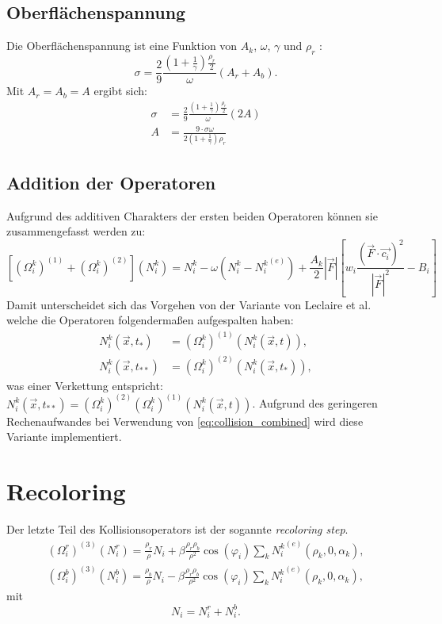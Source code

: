 \documentclass[a4paper,10pt]{scrreprt}
\begin{document}
\subsection{Oberflächenspannung}
Die Oberflächenspannung ist eine Funktion von $A_k$, $\omega$, $\gamma$ und $\rho_r$ \cite{Leclaire2011}:
\begin{equation}
 \sigma = \frac{2}{9} \frac{ \left( 1 + \frac{1}{\gamma} \right)   \frac{\rho_r}{2}  }{\omega} (A_r + A_b).
\end{equation}
Mit  $A_r = A_b = A$ ergibt sich:
\begin{align}
 \sigma &= \frac{2}{9} \frac{ \left( 1 + \frac{1}{\gamma} \right)   \frac{\rho_r}{2}  }{\omega} (2 A) \\
 A &= \frac{9 \cdot \sigma \omega}{ 2 \left( 1 + \frac{1}{\gamma} \right)   \rho_r  }
\end{align}


\subsection{Addition der Operatoren}
Aufgrund des additiven Charakters der ersten beiden Operatoren können sie zusammengefasst werden zu:
\begin{equation}
\label{eq:collision_combined}
 \left[ (\Omega_i^k)^{(1)} + (\Omega_i^k)^{(2)} \right] \left( N_i^k\right) = N_i^k - \omega \left(N_i^k - {N_i^k}^{(e)} \right) + \frac{A_k}{2} \left| \vec{F} \right| \left[w_i \frac{(\vec{F} \cdot \vec{c_i})^2 }{\left| \vec{F} \right|^2} -B_i  \right]
\end{equation}
Damit unterscheidet sich das Vorgehen von der Variante von Leclaire et al. \cite{Leclaire2011} welche die Operatoren folgendermaßen aufgespalten haben:
\begin{align}
 N_i^k (\vec{x},t_*) &= (\Omega_i^k)^{(1)} \left( N_i^k (\vec{x},t) \right), \\
N_i^k (\vec{x},t_{**}) &= (\Omega_i^k)^{(2)} \left( N_i^k (\vec{x},t_*) \right),
\end{align}
was einer Verkettung entspricht: $N_i^k (\vec{x},t_{**}) = (\Omega_i^k)^{(2)} (\Omega_i^k)^{(1)} \left( N_i^k (\vec{x},t) \right)$. 
Aufgrund des geringeren Rechenaufwandes bei Verwendung von \eqref{eq:collision_combined} wird diese Variante implementiert.

\section{Recoloring}
Der letzte Teil des Kollisionsoperators ist der sogannte \emph{recoloring step}.
\begin{align}
 (\Omega_i^r)^{(3)} \left(N_i^r\right) = \frac{\rho_r}{\rho} N_i + \beta \frac{\rho_r \rho_b}{\rho^2} \cos(\varphi_i) \sum_k  {N_i^k}^{(e)} (\rho_k,0,\alpha_k), \\
 (\Omega_i^b)^{(3)} \left(N_i^b\right) = \frac{\rho_b}{\rho} N_i - \beta \frac{\rho_r \rho_b}{\rho^2} \cos(\varphi_i) \sum_k  {N_i^k}^{(e)} (\rho_k,0,\alpha_k),
\end{align}
mit 
\begin{equation}
 N_i = N_i^r + N_i^b .
\end{equation}
\end{document}
